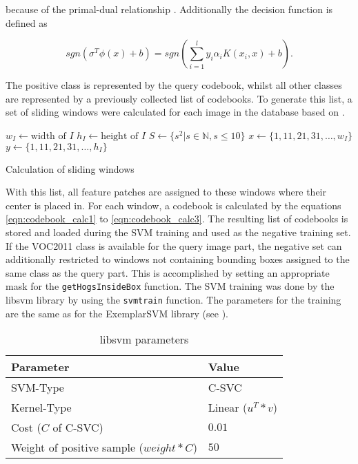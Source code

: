 because of the primal-dual relationship \cite{UBHD-66487423}. Additionally the decision function is defined as

\begin{equation}
sgn(\sigma^T \phi(x) + b) = sgn(\sum_{i=1}^{l} y_i \alpha_i K(x_i, x) + b).
\end{equation}

The positive class is represented by the query codebook, whilst all other classes are represented by a previously collected list of codebooks. To generate this list, a set of sliding windows were calculated for each image in the database based on .

\begin{algorithm}
    $w_I \gets \text{width of }I$\;
    $h_I \gets \text{height of }I$\;
    $S \gets \{s^2 | s \in \mathbb{N}, s \le 10 \}$\;
    $x \gets \{1, 11, 21, 31,\dots, w_I\}$\;
    $y \gets \{1, 11, 21, 31,\dots, h_I\}$\;
    \caption{Calculation of sliding windows}
    \label{alg:calc_windows}
\end{algorithm}

With this list, all feature patches are assigned to these windows where their center is placed in. For each window, a codebook is calculated by the equations \ref{eqn:codebook_calc1} to \ref{eqn:codebook_calc3}. The resulting list of codebooks is stored and loaded during the \ac{SVM} training and used as the negative training set. If the \ac{VOC2011} class is available for the query image part, the negative set can additionally restricted to windows not containing bounding boxes assigned to the same class as the query part. This is accomplished by setting an appropriate mask for the \verb|getHogsInsideBox| function. The \ac{SVM} training was done by the libsvm library \cite{Chang:2011:LLS:1961189.1961199} by using the \texttt{svmtrain} function. The parameters for the training are the same as for the ExemplarSVM library \cite{Malisiewicz2011} (see ).

\begin{table}
    \begin{tabular}{|l|l|}
        \hline
        \textbf{Parameter}   & \textbf{Value} \\ 
        \hline
        SVM-Type             & C-SVC \\ 
        \hline
        Kernel-Type          & Linear ($u^T*v$) \\ 
        \hline
        Cost ($C$ of C-SVC)  & $0.01$ \\ 
        \hline
        Weight of positive sample ($weight*C$) & $50$ \\ 
        \hline
    \end{tabular}
    \caption{libsvm parameters}
    \label{tab:libsvm_train_params}
\end{table}

